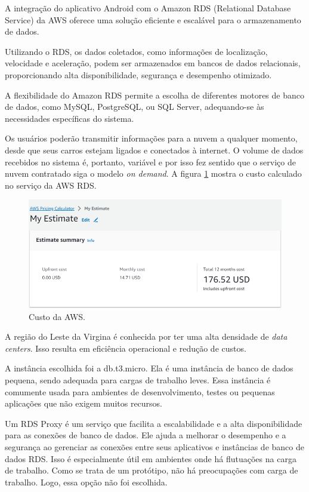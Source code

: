 A integração do aplicativo Android com o Amazon RDS (Relational Database Service) da AWS oferece uma solução eficiente e escalável para o armazenamento de dados. 

Utilizando o RDS, os dados coletados, como informações de localização, velocidade e aceleração, podem ser armazenados em bancos de dados relacionais, proporcionando alta disponibilidade, segurança e desempenho otimizado. 

A flexibilidade do Amazon RDS permite a escolha de diferentes motores de banco de dados, como MySQL, PostgreSQL, ou SQL Server, adequando-se às necessidades específicas do sistema.

Os usuários poderão transmitir informações para a nuvem a qualquer momento, desde que seus carros estejam ligados e conectados à internet. O volume de dados recebidos no sistema é, portanto, variável e por isso fez sentido que o serviço de nuvem contratado siga o modelo \textit{on demand}. A figura \ref{figure:custo_aws_inicial} mostra o custo calculado no serviço da AWS RDS.

\begin{figure}[hp]
    \centering
    
    \includegraphics[scale=0.8]{figures/custo_aws_inicial.PNG}
    \caption{Custo da AWS.}
    \label{figure:custo_aws_inicial}
    
\end{figure}

A região do Leste da Virgina é conhecida por ter uma alta densidade de \textit{data centers}. Isso resulta em eficiência operacional e redução de custos.

A instância escolhida foi a db.t3.micro. Ela é uma instância de banco de dados pequena, sendo adequada para cargas de trabalho leves. Essa instância é comumente usada para ambientes de desenvolvimento, testes ou pequenas aplicações que não exigem muitos recursos.

Um RDS Proxy é um serviço que facilita a escalabilidade e a alta disponibilidade para as conexões de banco de dados. Ele ajuda a melhorar o desempenho e a segurança ao gerenciar as conexões entre seus aplicativos e instâncias de banco de dados RDS. Isso é especialmente útil em ambientes onde há flutuações na carga de trabalho. Como se trata de um protótipo, não há preocupações com carga de trabalho. Logo, essa opção não foi escolhida.

